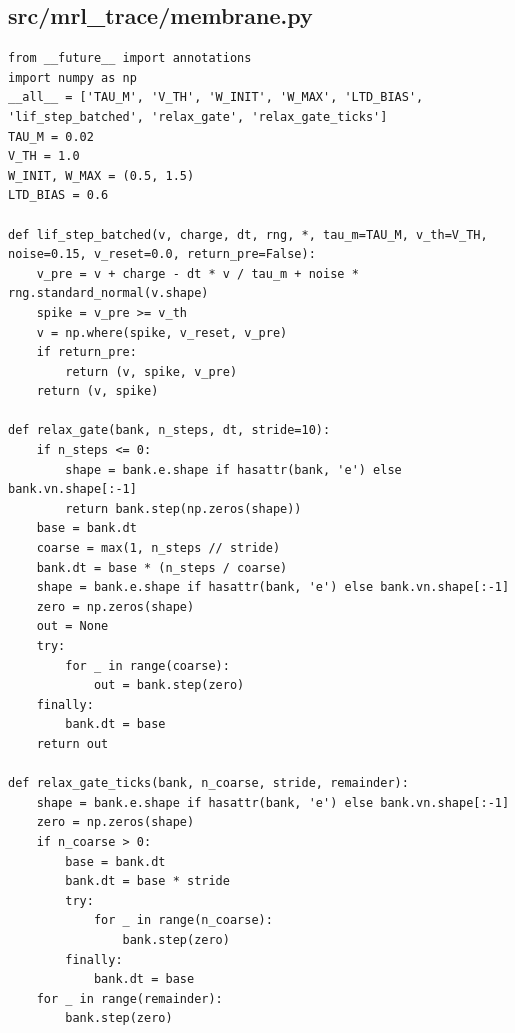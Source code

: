 \documentclass[a4paper,10pt]{article}
\begin{document}
\subsection{src/mrl\_trace/membrane.py}
\begin{Verbatim}
from __future__ import annotations
import numpy as np
__all__ = ['TAU_M', 'V_TH', 'W_INIT', 'W_MAX', 'LTD_BIAS', 'lif_step_batched', 'relax_gate', 'relax_gate_ticks']
TAU_M = 0.02
V_TH = 1.0
W_INIT, W_MAX = (0.5, 1.5)
LTD_BIAS = 0.6

def lif_step_batched(v, charge, dt, rng, *, tau_m=TAU_M, v_th=V_TH, noise=0.15, v_reset=0.0, return_pre=False):
    v_pre = v + charge - dt * v / tau_m + noise * rng.standard_normal(v.shape)
    spike = v_pre >= v_th
    v = np.where(spike, v_reset, v_pre)
    if return_pre:
        return (v, spike, v_pre)
    return (v, spike)

def relax_gate(bank, n_steps, dt, stride=10):
    if n_steps <= 0:
        shape = bank.e.shape if hasattr(bank, 'e') else bank.vn.shape[:-1]
        return bank.step(np.zeros(shape))
    base = bank.dt
    coarse = max(1, n_steps // stride)
    bank.dt = base * (n_steps / coarse)
    shape = bank.e.shape if hasattr(bank, 'e') else bank.vn.shape[:-1]
    zero = np.zeros(shape)
    out = None
    try:
        for _ in range(coarse):
            out = bank.step(zero)
    finally:
        bank.dt = base
    return out

def relax_gate_ticks(bank, n_coarse, stride, remainder):
    shape = bank.e.shape if hasattr(bank, 'e') else bank.vn.shape[:-1]
    zero = np.zeros(shape)
    if n_coarse > 0:
        base = bank.dt
        bank.dt = base * stride
        try:
            for _ in range(n_coarse):
                bank.step(zero)
        finally:
            bank.dt = base
    for _ in range(remainder):
        bank.step(zero)
\end{Verbatim}
\end{document}
